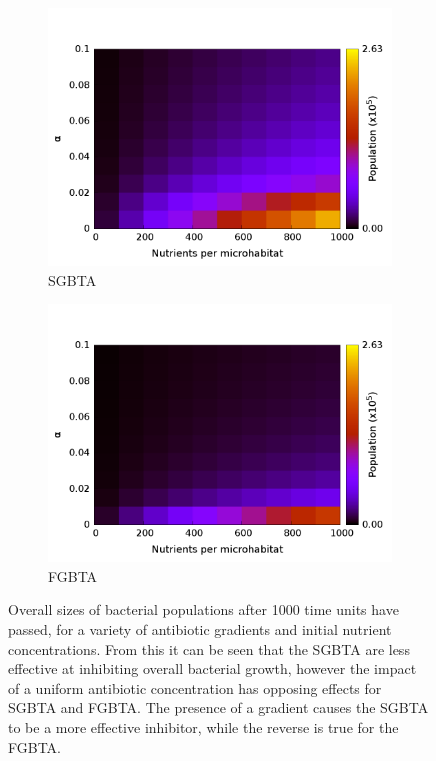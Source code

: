 \documentclass[a4paper,12pt]{article}
\begin{document}
\begin{figure}[h!]
 \centering
 \begin{subfigure}[h]{0.49\textwidth}
 \includegraphics[width=\textwidth]{simple-slowGrowers-S_Vs_Alpha-contours}
  \caption{SGBTA}
  \label{subfig:SGBTA-alphagrad-contours}
  \end{subfigure}
  \begin{subfigure}[h]{0.49\textwidth}
  \includegraphics[width=\textwidth]{simple-fastGrowers-S_Vs_Alpha-contours}
  \caption{FGBTA}
  \label{subfig:FGBTA-alphagrad-contours}
 \end{subfigure}
\caption{Overall sizes of bacterial populations after 1000 time units have passed, for a variety of antibiotic gradients and initial nutrient concentrations.  
From this it can be seen that the SGBTA are less effective at inhibiting overall bacterial growth, however the impact of a uniform antibiotic concentration has opposing effects 
for SGBTA and FGBTA.  The presence of a gradient causes the SGBTA to be a more effective inhibitor, while the reverse is true for the FGBTA.}
\label{fig:alpha-popsize-contours}
\end{figure}
\end{document}
